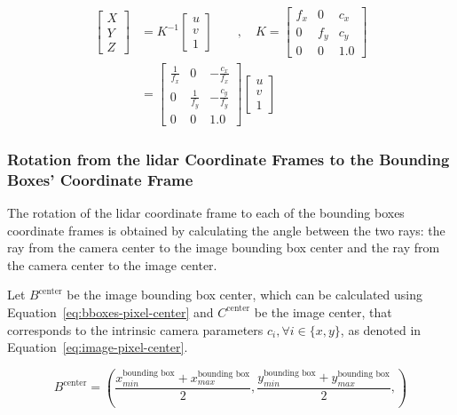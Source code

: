 \begin{align}
	\label{eq:back-projection}
	\begin{bmatrix}
		X \\
		Y \\
		Z
	\end{bmatrix}
	 & = K^{-1} 
	\begin{bmatrix}
		u \\
		v \\
		1
	\end{bmatrix}
\qquad , \quad
	K = 
	\begin{bmatrix}
		f_x & 0 & c_x \\
		0 & f_y & c_y \\
		0 & 0 & 1.0
	\end{bmatrix}
\nonumber \\	 
	&  = 
	\begin{bmatrix}
	\frac{1}{f_x} & 0 & -\frac{c_x}{f_x} \\
	0 & \frac{1}{f_y}  & -\frac{c_y}{f_y} \\
	0 & 0 & 1.0 
	\end{bmatrix}
	\begin{bmatrix}
		u \\
		v \\
		1
	\end{bmatrix}
\end{align}

\subsubsection{Rotation from the \acs{lidar} Coordinate Frames to the Bounding Boxes' Coordinate Frame}
The rotation of the \ac{lidar} coordinate frame to each of the bounding boxes coordinate frames is obtained by calculating the angle between the two rays: the ray from the camera center to the image bounding box center and the ray from the camera center to the image center. 

Let $B^\text{center}$ be the image bounding box center, which can be calculated using Equation~\eqref{eq:bboxes-pixel-center} and $C^\text{center}$ be the image center, that corresponds to the intrinsic camera parameters $c_i, \forall i \in \{x, y\}$, as denoted in Equation~\eqref{eq:image-pixel-center}.

\begin{equation}
	\label{eq:bboxes-pixel-center}	
B^\text{center} = \left(\frac{x^{\text{bounding box}}_{min} + x^{\text{bounding box}}_{max}}{2}, \frac{y^{\text{bounding box}}_{min} + y^{\text{bounding box}}_{max}}{2},\right)
\end{equation}

